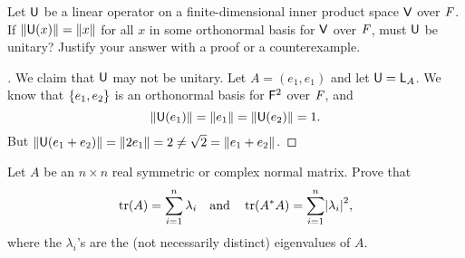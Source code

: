 \begin{ex}\label{ex:6.5.9}
  Let \(\mathsf{U}\) be a linear operator on a finite-dimensional inner product space \(\mathsf{V}\) over \(\mathit{F}\).
  If \(\left\lVert\mathsf{U}(x)\right\rVert = \left\lVert x\right\rVert\) for all \(x\) in some orthonormal basis for \(\mathsf{V}\) over \(\mathit{F}\), must \(\mathsf{U}\) be unitary?
  Justify your answer with a proof or a counterexample.
\end{ex}

\begin{proof}[]
  We claim that \(\mathsf{U}\) may not be unitary.
  Let \(A = (e_1, e_1)\) and let \(\mathsf{U} = \mathsf{L}_A\).
  We know that \(\left\lbrace e_1, e_2\right\rbrace\) is an orthonormal basis for \(\mathsf{F}^2\) over \(\mathit{F}\), and
  \[
    \left\lVert\mathsf{U}(e_1)\right\rVert = \left\lVert e_1\right\rVert = \left\lVert\mathsf{U}(e_2)\right\rVert = 1.
  \]
  But \(\left\lVert\mathsf{U}(e_1 + e_2)\right\rVert = \left\lVert2e_1\right\rVert = 2 \neq \sqrt{2} = \left\lVert e_1 + e_2\right\rVert\).
\end{proof}

\begin{ex}\label{ex:6.5.10}
  Let \(A\) be an \(n \times n\) real symmetric or complex normal matrix.
  Prove that
  \[
    \tr[A] = \sum_{i = 1}^n \lambda_i \quad \text{and} \quad \tr[A^* A] = \sum_{i = 1}^n \abs{\lambda_i}^2,
  \]
  where the \(\lambda_i\)'s are the (not necessarily distinct) eigenvalues of \(A\).
\end{ex}

